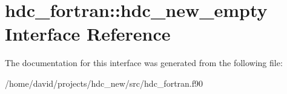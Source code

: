 \hypertarget{interfacehdc__fortran_1_1hdc__new__empty}{}\section{hdc\+\_\+fortran\+:\+:hdc\+\_\+new\+\_\+empty Interface Reference}
\label{interfacehdc__fortran_1_1hdc__new__empty}


The documentation for this interface was generated from the following file\+:\begin{DoxyCompactItemize}
\item 
/home/david/projects/hdc\+\_\+new/src/hdc\+\_\+fortran.\+f90\end{DoxyCompactItemize}
